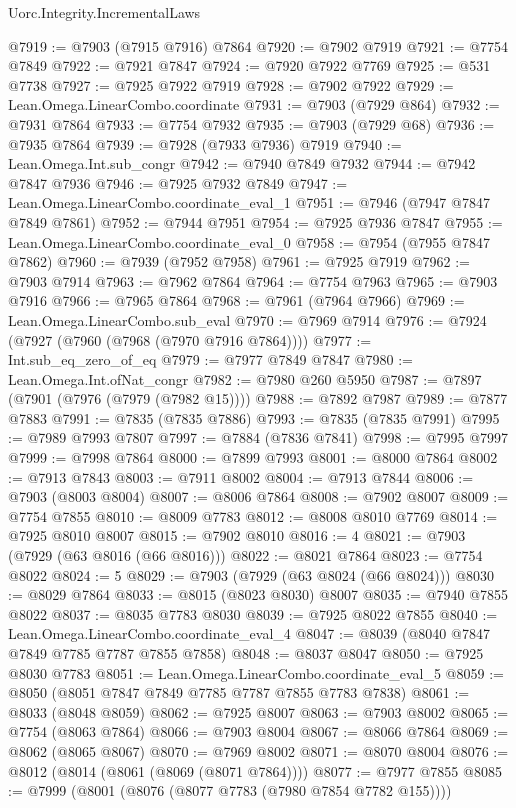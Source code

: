 \begin{lexlean}{Uorc.Integrity.IncrementalLaws}
\begin{coremodule}
@7919 := @7903 (@7915 @7916) @7864
@7920 := @7902 @7919
@7921 := @7754 @7849
@7922 := @7921 @7847
@7924 := @7920 @7922 @7769
@7925 := @531 @7738
@7927 := @7925 @7922 @7919
@7928 := @7902 @7922
@7929 := Lean.Omega.LinearCombo.coordinate
@7931 := @7903 (@7929 @864)
@7932 := @7931 @7864
@7933 := @7754 @7932
@7935 := @7903 (@7929 @68)
@7936 := @7935 @7864
@7939 := @7928 (@7933 @7936) @7919
@7940 := Lean.Omega.Int.sub_congr
@7942 := @7940 @7849 @7932
@7944 := @7942 @7847 @7936
@7946 := @7925 @7932 @7849
@7947 := Lean.Omega.LinearCombo.coordinate_eval_1
@7951 := @7946 (@7947 @7847 @7849 @7861)
@7952 := @7944 @7951
@7954 := @7925 @7936 @7847
@7955 := Lean.Omega.LinearCombo.coordinate_eval_0
@7958 := @7954 (@7955 @7847 @7862)
@7960 := @7939 (@7952 @7958)
@7961 := @7925 @7919
@7962 := @7903 @7914
@7963 := @7962 @7864
@7964 := @7754 @7963
@7965 := @7903 @7916
@7966 := @7965 @7864
@7968 := @7961 (@7964 @7966)
@7969 := Lean.Omega.LinearCombo.sub_eval
@7970 := @7969 @7914
@7976 := @7924 (@7927 (@7960 (@7968 (@7970 @7916 @7864))))
@7977 := Int.sub_eq_zero_of_eq
@7979 := @7977 @7849 @7847
@7980 := Lean.Omega.Int.ofNat_congr
@7982 := @7980 @260 @5950
@7987 := @7897 (@7901 (@7976 (@7979 (@7982 @15))))
@7988 := @7892 @7987
@7989 := @7877 @7883
@7991 := @7835 (@7835 @7886)
@7993 := @7835 (@7835 @7991)
@7995 := @7989 @7993 @7807
@7997 := @7884 (@7836 @7841)
@7998 := @7995 @7997
@7999 := @7998 @7864
@8000 := @7899 @7993
@8001 := @8000 @7864
@8002 := @7913 @7843
@8003 := @7911 @8002
@8004 := @7913 @7844
@8006 := @7903 (@8003 @8004)
@8007 := @8006 @7864
@8008 := @7902 @8007
@8009 := @7754 @7855
@8010 := @8009 @7783
@8012 := @8008 @8010 @7769
@8014 := @7925 @8010 @8007
@8015 := @7902 @8010
@8016 := 4
@8021 := @7903 (@7929 (@63 @8016 (@66 @8016)))
@8022 := @8021 @7864
@8023 := @7754 @8022
@8024 := 5
@8029 := @7903 (@7929 (@63 @8024 (@66 @8024)))
@8030 := @8029 @7864
@8033 := @8015 (@8023 @8030) @8007
@8035 := @7940 @7855 @8022
@8037 := @8035 @7783 @8030
@8039 := @7925 @8022 @7855
@8040 := Lean.Omega.LinearCombo.coordinate_eval_4
@8047 := @8039 (@8040 @7847 @7849 @7785 @7787 @7855 @7858)
@8048 := @8037 @8047
@8050 := @7925 @8030 @7783
@8051 := Lean.Omega.LinearCombo.coordinate_eval_5
@8059 := @8050 (@8051 @7847 @7849 @7785 @7787 @7855 @7783 @7838)
@8061 := @8033 (@8048 @8059)
@8062 := @7925 @8007
@8063 := @7903 @8002
@8065 := @7754 (@8063 @7864)
@8066 := @7903 @8004
@8067 := @8066 @7864
@8069 := @8062 (@8065 @8067)
@8070 := @7969 @8002
@8071 := @8070 @8004
@8076 := @8012 (@8014 (@8061 (@8069 (@8071 @7864))))
@8077 := @7977 @7855
@8085 := @7999 (@8001 (@8076 (@8077 @7783 (@7980 @7854 @7782 @155))))

\end{coremodule}
\end{lexlean}
